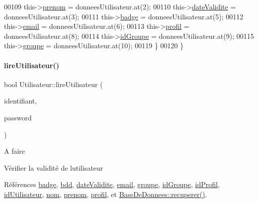\begin{DoxyCode}
00109         this->\hyperlink{class_utilisateur_a1dd0779807b19298f30f39d9c371170f}{prenom} = donneesUtilisateur.at(2);
00110         this->\hyperlink{class_utilisateur_a898cd6f5a64d733ad49a8a74388326cd}{dateValidite} = donneesUtilisateur.at(3);
00111         this->\hyperlink{class_utilisateur_a77b48aa9d1f0ec04c69d45476897fec6}{badge} = donneesUtilisateur.at(5);
00112         this->\hyperlink{class_utilisateur_a2f45443ce5277a5e6baefe5121e66555}{email} = donneesUtilisateur.at(6);
00113         this->\hyperlink{class_utilisateur_ab03707f32fadf99ae0a0a27d59470646}{profil} = donneesUtilisateur.at(8);
00114         this->\hyperlink{class_utilisateur_a13c3425772da1d5501e6fe4a2f2b8194}{idGroupe} = donneesUtilisateur.at(9);
00115         this->\hyperlink{class_utilisateur_af795d9518a4eebe00c5b24937732ab2b}{groupe} = donneesUtilisateur.at(10);
00119     \}
00120 \}
\end{DoxyCode}
\mbox{\label{class_utilisateur_a5911f84daf6d47d7f50e6d16022b292e}} 
\paragraph{\texorpdfstring{lire\+Utilisateur()}{lireUtilisateur()}}
{\footnotesize\ttfamily bool Utilisateur\+::lire\+Utilisateur (\begin{DoxyParamCaption}\item[{Q\+String}]{identifiant,  }\item[{Q\+String}]{password }\end{DoxyParamCaption})}

\begin{DoxyRefDesc}{A faire}
\item[\hyperlink{todo__todo000004}{A faire}]Vérifier la validité de l\textquotesingle{}utilisateur \end{DoxyRefDesc}


Références \hyperlink{class_utilisateur_a77b48aa9d1f0ec04c69d45476897fec6}{badge}, \hyperlink{class_utilisateur_a94fa14e95bd90358fb67eca0170e1724}{bdd}, \hyperlink{class_utilisateur_a898cd6f5a64d733ad49a8a74388326cd}{date\+Validite}, \hyperlink{class_utilisateur_a2f45443ce5277a5e6baefe5121e66555}{email}, \hyperlink{class_utilisateur_af795d9518a4eebe00c5b24937732ab2b}{groupe}, \hyperlink{class_utilisateur_a13c3425772da1d5501e6fe4a2f2b8194}{id\+Groupe}, \hyperlink{class_utilisateur_a042947e8b86637d1eb012c3fc89a959e}{id\+Profil}, \hyperlink{class_utilisateur_ae1763e7a52c82c63506bc4160cdabb20}{id\+Utilisateur}, \hyperlink{class_utilisateur_a1096e809aca4b7cf453a7af93cb72502}{nom}, \hyperlink{class_utilisateur_a1dd0779807b19298f30f39d9c371170f}{prenom}, \hyperlink{class_utilisateur_ab03707f32fadf99ae0a0a27d59470646}{profil}, et \hyperlink{class_base_de_donnees_a77539baad389f5acf754cd2cd452403e}{Base\+De\+Donnees\+::recuperer()}.


